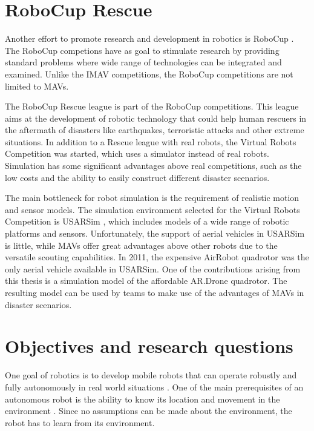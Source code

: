 	\section{RoboCup Rescue}
Another effort to promote research and development in robotics is RoboCup \cite{kitano1997robocup}.
The RoboCup competions have as goal to stimulate research by providing standard problems where wide range of technologies can be integrated and examined.
Unlike the IMAV competitions, the RoboCup competitions are not limited to MAVs.

The RoboCup Rescue league \cite{kitano1999robocup} is part of the RoboCup competitions.
This league aims at the development of robotic technology that could 
help human rescuers in the aftermath of disasters like earthquakes, terroristic attacks and other extreme situations.
In addition to a Rescue league with real robots, the Virtual Robots Competition was started, which uses a simulator instead of real robots.
Simulation has some \mbox{significant} advantages above real competitions, such as the low costs and the ability to easily construct different disaster scenarios.

The main bottleneck for robot simulation is the requirement of realistic motion and sensor models.
The simulation environment selected for the Virtual Robots Competition is USARSim \cite{Balakirsky2009iros,carpin2007usarsim}, which includes models of a wide range of robotic platforms and sensors.
Unfortunately, the support of aerial vehicles in USARSim is little, while MAVs offer great advantages above other robots due to the versatile scouting capabilities.
In 2011, the expensive AirRobot quadrotor was the only aerial vehicle available in USARSim.
One of the contributions arising from this thesis is a simulation model of the affordable AR.Drone quadrotor.
The resulting model can be used by teams to make use of the advantages of MAVs in disaster scenarios.


	\section{Objectives and research questions}
One goal of robotics is to develop mobile robots that can operate robustly and fully autonomously in real world situations \cite{murphy2000introduction}.
One of the main prerequisites of an autonomous robot is the ability to know its location and movement in the environment \cite{talluri1992position}.
Since no assumptions can be made about the environment, the robot has to learn from its environment.

